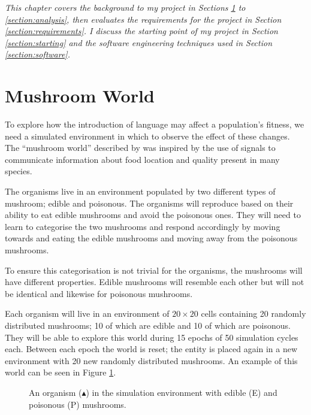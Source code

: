 \documentclass[12pt,a4paper,twoside,openright]{report}
\begin{document}
\emph{This chapter covers the background to my project in Sections \ref{section:world} to \ref{section:analysis}, then evaluates the requirements for the project in Section \ref{section:requirements}. I discuss the starting point of my project in Section \ref{section:starting} and the software engineering techniques used in Section \ref{section:software}.}

\section{Mushroom World}\label{section:world}

To explore how the introduction of language may affect a population's fitness, we need a simulated environment in which to observe the effect of these changes. The ``mushroom world'' described by \cite{Cangelosi1998} was inspired by the use of signals to communicate information about food location and quality present in many species.

The organisms live in an environment populated by two different types of mushroom; edible and poisonous. The organisms will reproduce based on their ability to eat edible mushrooms and avoid the poisonous ones. They will need to learn to categorise the two mushrooms and respond accordingly by moving towards and eating the edible mushrooms and moving away from the poisonous mushrooms.

To ensure this categorisation is not trivial for the organisms, the mushrooms will have different properties. Edible mushrooms will resemble each other but will not be identical and likewise for poisonous mushrooms.

Each organism will live in an environment of $20 \times 20$ cells containing 20 randomly distributed mushrooms; 10 of which are edible and 10 of which are poisonous. They will be able to explore this world during 15 epochs of 50 simulation cycles each. Between each epoch the world is reset; the entity is placed again in a new environment with 20 new randomly distributed mushrooms. An example of this world can be seen in Figure \ref{fig:environment}.

\begin{figure}[ht]
\centering
{}
\caption{An organism ($\blacktriangle$) in the simulation environment with edible (E) and poisonous (P) mushrooms.}
\label{fig:environment}
\end{figure}
\end{document}

